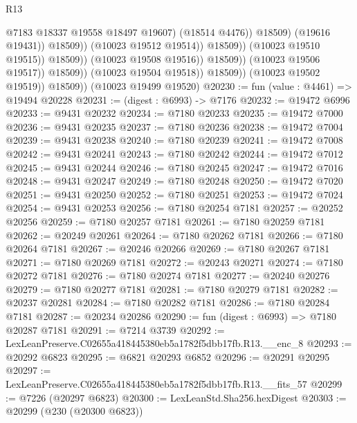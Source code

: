\begin{lexlean}{R13}
\begin{coremodule}
                                                    @7183
                                                    @18337
                                                    @19558
                                                    @18497
                                                    @19607)
                                                  (@18514 @4476))
                                                @18509)
                                              (@19616 @19431))
                                            @18509))
                                        (@10023 @19512 @19514))
                                      @18509))
                                  (@10023 @19510 @19515))
                                @18509))
                            (@10023 @19508 @19516))
                          @18509))
                      (@10023 @19506 @19517))
                    @18509))
                (@10023 @19504 @19518))
              @18509))
          (@10023 @19502 @19519))
        @18509))
    (@10023 @19499 @19520)
@20230 := fun (value : @4461) => @19494 @20228
@20231 := (digest : @6993) -> @7176
@20232 := @19472 @6996
@20233 := @9431 @20232
@20234 := @7180 @20233
@20235 := @19472 @7000
@20236 := @9431 @20235
@20237 := @7180 @20236
@20238 := @19472 @7004
@20239 := @9431 @20238
@20240 := @7180 @20239
@20241 := @19472 @7008
@20242 := @9431 @20241
@20243 := @7180 @20242
@20244 := @19472 @7012
@20245 := @9431 @20244
@20246 := @7180 @20245
@20247 := @19472 @7016
@20248 := @9431 @20247
@20249 := @7180 @20248
@20250 := @19472 @7020
@20251 := @9431 @20250
@20252 := @7180 @20251
@20253 := @19472 @7024
@20254 := @9431 @20253
@20256 := @7180 @20254 @7181
@20257 := @20252 @20256
@20259 := @7180 @20257 @7181
@20261 := @7180 @20259 @7181
@20262 := @20249 @20261
@20264 := @7180 @20262 @7181
@20266 := @7180 @20264 @7181
@20267 := @20246 @20266
@20269 := @7180 @20267 @7181
@20271 := @7180 @20269 @7181
@20272 := @20243 @20271
@20274 := @7180 @20272 @7181
@20276 := @7180 @20274 @7181
@20277 := @20240 @20276
@20279 := @7180 @20277 @7181
@20281 := @7180 @20279 @7181
@20282 := @20237 @20281
@20284 := @7180 @20282 @7181
@20286 := @7180 @20284 @7181
@20287 := @20234 @20286
@20290 := fun (digest : @6993) => @7180 @20287 @7181
@20291 := @7214 @3739
@20292 := LexLeanPreserve.C02655a418445380eb5a1782f5dbb17fb.R13.__enc_8
@20293 := @20292 @6823
@20295 := @6821 @20293 @6852
@20296 := @20291 @20295
@20297 := LexLeanPreserve.C02655a418445380eb5a1782f5dbb17fb.R13.__fits_57
@20299 := @7226 (@20297 @6823)
@20300 := LexLeanStd.Sha256.hexDigest
@20303 := @20299 (@230 (@20300 @6823))

\end{coremodule}
\end{lexlean}
